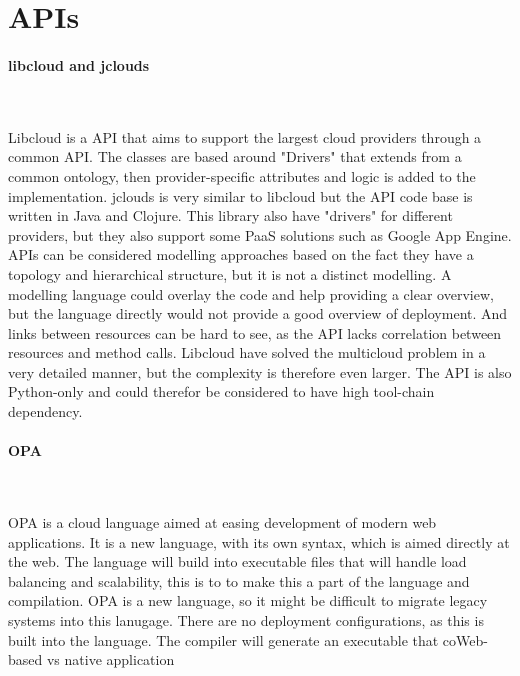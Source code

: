 \section{APIs}

\paragraph{libcloud and jclouds}~\cite{libcloud, jclouds}

Libcloud is a API that aims to support the largest cloud providers through a common API. 
The classes are based around "Drivers" that extends from a common ontology, then provider-specific attributes and logic is added to the implementation.
jclouds is very similar to libcloud but the API code base is written in Java and Clojure. 
This library also have "drivers" for different providers, but they also support some PaaS solutions such as Google App Engine.
APIs can be considered modelling approaches based on the fact they have a topology and hierarchical structure, 
but it is not a distinct modelling. A modelling language could overlay the code and help providing a clear overview, 
but the language directly would not provide a good overview of deployment. 
And links between resources can be hard to see, as the API lacks correlation between resources and method calls. 
Libcloud have solved the multicloud problem in a very detailed manner, but the complexity is therefore even larger. 
The API is also Python-only and could therefor be considered to have high tool-chain dependency.

\paragraph{OPA}~\cite{opa}

OPA is a cloud language aimed at easing development of modern web applications. It is a new language, 
with its own syntax, which is aimed directly at the web. The language will build into executable files that will handle load balancing and scalability, 
this is to to make this a part of the language and compilation.
OPA is a new language, so it might be difficult to migrate legacy systems into this lanugage. 
There are no deployment configurations, as this is built into the language. The compiler will generate an executable that coWeb-based vs native application

